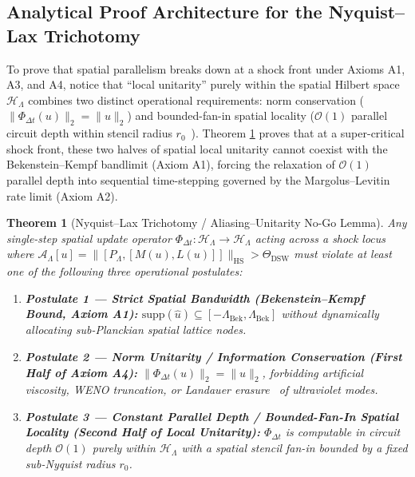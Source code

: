 \documentclass[11pt,a4paper]{article}
\newtheorem{theorem}{Theorem}[section]
\theoremstyle{definition}
\begin{document}
\subsection{Analytical Proof Architecture for the Nyquist--Lax Trichotomy}
\label{subsec:nyquist-lax-trichotomy}
To prove that spatial parallelism breaks down at a shock front under Axioms A1, A3, and A4, notice that ``local unitarity'' purely within the spatial Hilbert space $\mathcal{H}_{\Lambda}$ combines two distinct operational requirements: norm conservation ($\|\Phi_{\Delta t}(u)\|_2 = \|u\|_2$) and bounded-fan-in spatial locality ($\mathcal{O}(1)$ parallel circuit depth within stencil radius $r_0$~\cite{liebrobinson1972}). Theorem \ref{thm:nyquist-lax-trichotomy} proves that at a super-critical shock front, these two halves of spatial local unitarity cannot coexist with the Bekenstein--Kempf bandlimit (Axiom A1), forcing the relaxation of $\mathcal{O}(1)$ parallel depth into sequential time-stepping governed by the Margolus--Levitin rate limit (Axiom A2).
\begin{theorem}[Nyquist--Lax Trichotomy / Aliasing--Unitarity No-Go Lemma]
\label{thm:nyquist-lax-trichotomy}
Any single-step spatial update operator $\Phi_{\Delta t} : \mathcal{H}_{\Lambda} \to \mathcal{H}_{\Lambda}$ acting across a shock locus where $\mathcal{A}_{\Lambda}[u] = \|[P_{\Lambda}, [M(u), L(u)]]\|_{\text{HS}} > \Theta_{\text{DSW}}$ must violate at least one of the following three operational postulates:
\begin{enumerate}
\item \textbf{Postulate 1 --- Strict Spatial Bandwidth (Bekenstein--Kempf Bound, Axiom A1):} $\mathrm{supp}(\hat{u}) \subseteq [-\Lambda_{\text{Bek}}, \Lambda_{\text{Bek}}]$ without dynamically allocating sub-Planckian spatial lattice nodes.
\item \textbf{Postulate 2 --- Norm Unitarity / Information Conservation (First Half of Axiom A4):} $\|\Phi_{\Delta t}(u)\|_2 = \|u\|_2$, forbidding artificial viscosity, WENO truncation, or Landauer erasure~\cite{landauer1961} of ultraviolet modes.
\item \textbf{Postulate 3 --- Constant Parallel Depth / Bounded-Fan-In Spatial Locality (Second Half of Local Unitarity):} $\Phi_{\Delta t}$ is computable in circuit depth $\mathcal{O}(1)$ purely within $\mathcal{H}_{\Lambda}$ with a spatial stencil fan-in bounded by a fixed sub-Nyquist radius $r_0$.
\end{enumerate}
\end{theorem}
\end{document}

